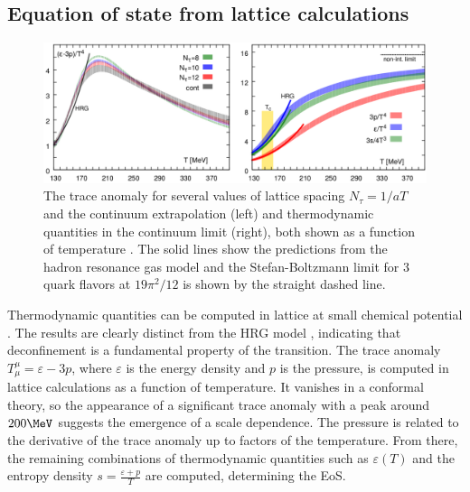 \subsection{Equation of state from lattice calculations}
\label{subsec:lattice}

\begin{figure}[t]
  \includegraphics[width=\linewidth]{lattice_eos.png}
  \caption{The trace anomaly for several values of lattice spacing $N_\tau = 1/aT$ and the continuum extrapolation (left) and thermodynamic quantities in the continuum limit (right), both shown as a function of temperature \cite{Bazavov:2014pvz}. The solid lines show the predictions from the hadron resonance gas model and the Stefan-Boltzmann limit for 3 quark flavors at $19\pi^2/12$ is shown by the straight dashed line.}
  \label{fig:lattice_eos}
\end{figure}

Thermodynamic quantities can be computed in lattice \qcd at small chemical potential \cite{Borsanyi:2013bia,Bazavov:2014pvz}.
The results are clearly distinct from the \ac{HRG} model \cite{Huovinen:2009yb}, indicating that deconfinement is a fundamental property of the transition.
The trace anomaly $T_\mu^\mu = \varepsilon - 3 p$, where $\varepsilon$ is the energy density and $p$ is the pressure, is computed in lattice calculations as a function of temperature.
It vanishes in a conformal theory, so the appearance of a significant trace anomaly with a peak around $200 \MeV$ suggests the emergence of a scale dependence.
The pressure is related to the derivative of the trace anomaly up to factors of the temperature.
From there, the remaining combinations of thermodynamic quantities such as $\varepsilon(T)$ and the entropy density $s = \frac{\varepsilon + p}{T}$ are computed, determining the \ac{EoS}.

